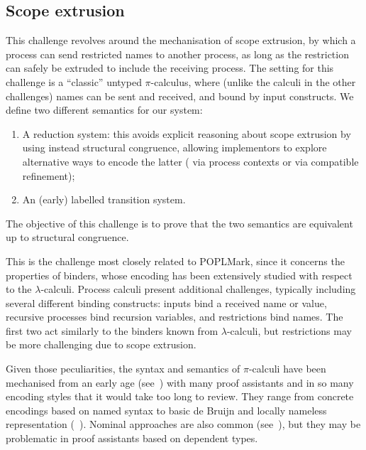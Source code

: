 \documentclass[runningheads]{llncs}
\begin{document}
\subsection{Scope extrusion}
This challenge revolves around the mechanisation of %
scope
extrusion, by which a process can send restricted names to another
process, as long as the restriction can safely be extruded to include
the receiving process.  The setting for this challenge is a
``classic'' untyped \( \pi \)-calculus, where (unlike the calculi in
the other challenges) names can be sent and received, and bound by
input constructs.  We define two different semantics for our system:
\begin{enumerate}
\item A reduction system: this avoids explicit reasoning about scope
  extrusion by using instead structural congruence, allowing
  implementors to explore alternative ways to encode the latter (\eg
  via process contexts or via compatible refinement);
\item An (early) labelled transition system.
\end{enumerate}
The objective of this
challenge is to prove that the two semantics are equivalent up to
structural congruence.

This is the challenge most closely related to  POPLMark, 
since it concerns the properties of binders, whose encoding has been
extensively studied with respect to the $\lambda$-calculi. Process calculi
present additional challenges,  typically including several
different binding constructs: inputs bind a received name or value,
recursive processes bind recursion variables, and restrictions bind
names.  The first two act similarly to the binders known from
$\lambda$-calculi, but restrictions may be more challenging due to
scope extrusion.

Given those peculiarities, the syntax and semantics of $\pi$-calculi have been
mechanised from an early age (see~\cite{Melham1994}) with many proof
assistants and in so many encoding styles that it would take too long to
review.  They range from concrete encodings based on named syntax
\cite{Melham1994} to basic de Bruijn  and locally nameless
representation %
(\eg~\cite{Castro2020}).
Nominal approaches are also common (see~\cite{Bengtson2009}), but they
may be problematic in proof assistants based on dependent types.
\end{document}
